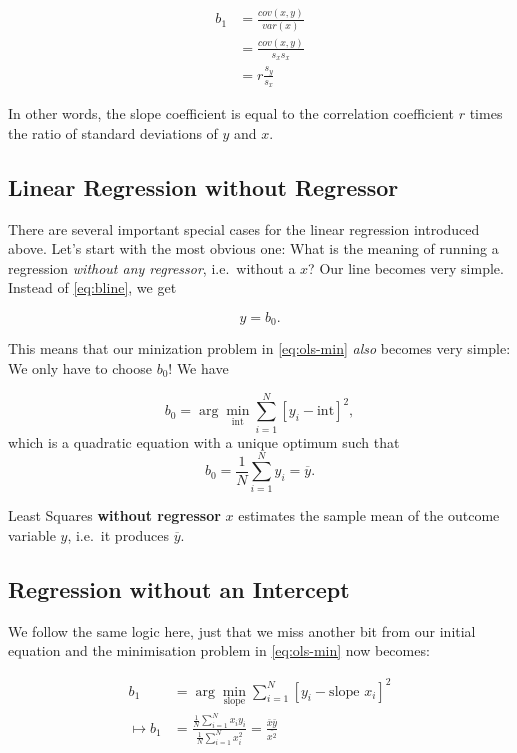 \documentclass[]{book}
\newenvironment{tip}{\begin{tcolorbox}[colback=green!5!white,colframe=green]}{\end{tcolorbox}}
\begin{document}
\begin{align}
b_1 &= \frac{cov(x,y)}{var(x)}\\
    &= \frac{cov(x,y)}{s_x s_x} \\
    &= r\frac{s_y}{s_x} \label{eq:beta1-r}
\end{align}

In other words, the slope coefficient is equal to the correlation
coefficient \(r\) times the ratio of standard deviations of \(y\) and
\(x\).

\subsection{Linear Regression without
Regressor}\label{linear-regression-without-regressor}

There are several important special cases for the linear regression
introduced above. Let's start with the most obvious one: What is the
meaning of running a regression \emph{without any regressor},
i.e.~without a \(x\)? Our line becomes very simple. Instead of
\eqref{eq:bline}, we get

\begin{equation}
y = b_0. \label{eq:b0line}
\end{equation}

This means that our minization problem in \eqref{eq:ols-min} \emph{also}
becomes very simple: We only have to choose \(b_0\)! We have

\[
b_0 = \arg\min_{\text{int}} \sum_{i=1}^N \left[y_i - \text{int}\right]^2,
\] which is a quadratic equation with a unique optimum such that \[
b_0 = \frac{1}{N} \sum_{i=1}^N y_i = \overline{y}.
\]

\begin{tip}
Least Squares \textbf{without regressor} \(x\) estimates the sample mean
of the outcome variable \(y\), i.e.~it produces \(\overline{y}\).
\end{tip}

\subsection{Regression without an
Intercept}\label{regression-without-an-intercept}

We follow the same logic here, just that we miss another bit from our
initial equation and the minimisation problem in \eqref{eq:ols-min} now
becomes:

\begin{align}
b_1 &= \arg\min_{\text{slope}} \sum_{i=1}^N \left[y_i - \text{slope } x_i \right]^2\\
\mapsto b_1 &= \frac{\frac{1}{N}\sum_{i=1}^N x_i y_i}{\frac{1}{N}\sum_{i=1}^N x_i^2} = \frac{\bar{x} \bar{y}}{\overline{x^2}} \label{eq:b1line}
\end{align}
\end{document}
